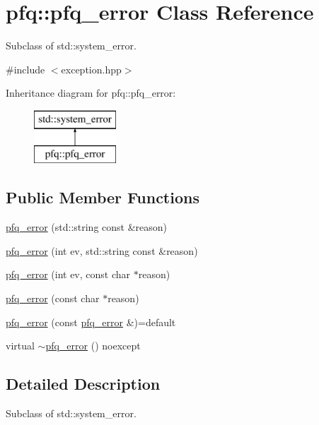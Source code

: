 \hypertarget{classpfq_1_1pfq__error}{\section{pfq\+:\+:pfq\+\_\+error Class Reference}
\label{classpfq_1_1pfq__error}
}


Subclass of std\+::system\+\_\+error.  




{\ttfamily \#include $<$exception.\+hpp$>$}

Inheritance diagram for pfq\+:\+:pfq\+\_\+error\+:\begin{figure}[H]
\begin{center}
\leavevmode
\includegraphics[height=2.000000cm]{classpfq_1_1pfq__error}
\end{center}
\end{figure}
\subsection*{Public Member Functions}
\begin{DoxyCompactItemize}
\item 
\hyperlink{classpfq_1_1pfq__error_af30cff741114b46fd4c50cef987d3ac4}{pfq\+\_\+error} (std\+::string const \&reason)
\item 
\hyperlink{classpfq_1_1pfq__error_ad11ae06da6b581f49d40081d51ae4a6b}{pfq\+\_\+error} (int ev, std\+::string const \&reason)
\item 
\hyperlink{classpfq_1_1pfq__error_a200dca27eee04a6da834364b9342a81d}{pfq\+\_\+error} (int ev, const char $\ast$reason)
\item 
\hyperlink{classpfq_1_1pfq__error_a5af35c9d9dea6aceff0672b92ad6b844}{pfq\+\_\+error} (const char $\ast$reason)
\item 
\hyperlink{classpfq_1_1pfq__error_a64f033ecc5b20bd22872fee3f22fd499}{pfq\+\_\+error} (const \hyperlink{classpfq_1_1pfq__error}{pfq\+\_\+error} \&)=default
\item 
virtual \hyperlink{classpfq_1_1pfq__error_a0aeb73a633e889817967897ef28b3512}{$\sim$pfq\+\_\+error} () noexcept
\end{DoxyCompactItemize}


\subsection{Detailed Description}
Subclass of std\+::system\+\_\+error. 

